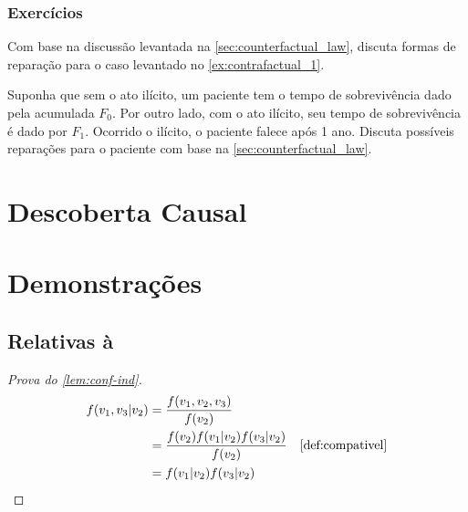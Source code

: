 \subsection{Exercícios}

\begin{exercise}
 Com base na discussão levantada na \cref{sec:counterfactual_law},
 discuta formas de reparação para
 o caso levantado no \cref{ex:contrafactual_1}.
\end{exercise}

\begin{exercise}
 Suponha que sem o ato ilícito,
 um paciente tem o tempo de sobrevivência dado
 pela acumulada $F_0$.
 Por outro lado, com o ato ilícito,
 seu tempo de sobrevivência é dado por $F_1$.
 Ocorrido o ilícito, o paciente falece após 1 ano.
 Discuta possíveis reparações para
 o paciente com base na \cref{sec:counterfactual_law}.
\end{exercise}

\chapter{Descoberta Causal}





\appendix
\chapter{Demonstrações}

\section{Relativas à }

\begin{proof}[Prova do \cref{lem:conf-ind}]
 \begin{align*}
  f(v_1,v_3|v_2) 
  &= \frac{f(v_1,v_2,v_3)}{f(v_2)} \\
  &= \frac{f(v_2)f(v_1|v_2)f(v_3|v_2)}{f(v_2)} 
  & \text{\cref{def:compativel}} \\
  &= f(v_1|v_2)f(v_3|v_2)
 \end{align*}
\end{proof}

